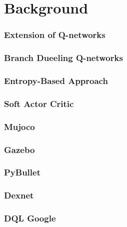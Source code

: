 
\chapter{Background}\label{chapter:background}


    
    
    

        


        \subsection{Extension of Q-networks}
        \subsection{Branch Dueeling Q-networks}

        \subsection{Entropy-Based Approach}
        \subsection{Soft Actor Critic}



    \subsection{Mujoco}
    \subsection{Gazebo}
    \subsection{PyBullet}

    \subsection{Dexnet}
    \subsection{DQL Google}
